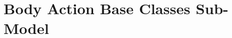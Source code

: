 %

\renewcommand\modelpartname{Body Action Base Classes Sub-Model}
\renewcommand\modelpartid{BodyAction}
\part{\modelpartname}\label{part:\modelpartid}






